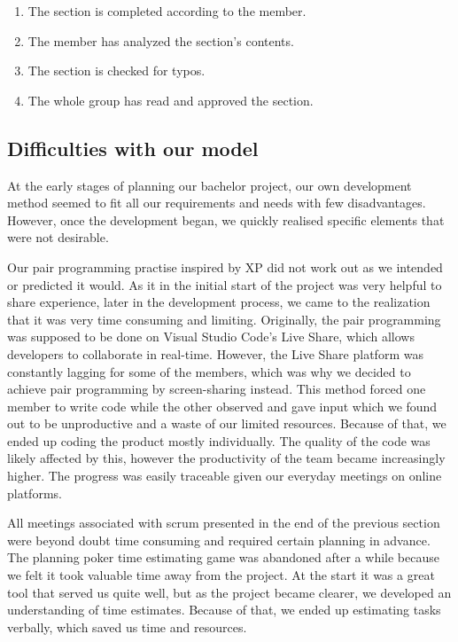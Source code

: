 \begin{enumerate}
    \item The section is completed according to the member.
    \item The member has analyzed the section's contents.
    \item The section is checked for typos.
    \item The whole group has read and approved the section.
\end{enumerate}

\subsection{Difficulties with our model}
At the early stages of planning our bachelor project, our own development method seemed to fit all our requirements and needs with few disadvantages. However, once the development began, we quickly realised specific elements that were not desirable. 

Our pair programming practise inspired by XP did not work out as we intended or predicted it would. As it in the initial start of the project was very helpful to share experience, later in the development process, we came to the realization that it was very time consuming and limiting. Originally, the pair programming was supposed to be done on Visual Studio Code's Live Share, which allows developers to collaborate in real-time. However, the Live Share platform was constantly lagging for some of the members, which was why we decided to achieve pair programming by screen-sharing instead. This method forced one member to write code while the other observed and gave input which we found out to be unproductive and a waste of our limited resources. Because of that, we ended up coding the product mostly individually. The quality of the code was likely affected by this, however the productivity of the team became increasingly higher. The progress was easily traceable given our everyday meetings on online platforms.   

All meetings associated with scrum presented in the end of the previous section were beyond doubt time consuming and required certain planning in advance. The planning poker time estimating game was abandoned after a while because we felt it took valuable time away from the project. At the start it was a great tool that served us quite well, but as the project became clearer, we developed an understanding of time estimates. Because of that, we ended up estimating tasks verbally, which saved us time and resources.  

